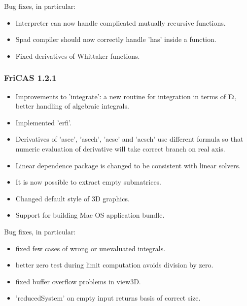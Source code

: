 Bug fixes, in particular:

\begin{itemize}
\item Interpreter can now handle complicated mutually recursive
  functions.

\item Spad compiler should now correctly handle 'has' inside a function.

\item Fixed derivatives of Whittaker functions.
\end{itemize}

\subsubsection{FriCAS 1.2.1}
\begin{itemize}
\item Improvements to 'integrate': a new routine for integration in
  terms of Ei, better handling of algebraic integrals.

\item Implemented 'erfi'.

\item Derivatives of 'asec', 'asech', 'acsc' and 'acsch' use different
  formula so that numeric evaluation of derivative will take correct
  branch on real axis.

\item Linear dependence package is changed to be consistent with
  linear solvers.

\item It is now possible to extract empty submatrices.

\item Changed default style of 3D graphics.

\item Support for building Mac OS application bundle.
\end{itemize}

Bug fixes, in particular:

\begin{itemize}
\item fixed few cases of wrong or unevaluated integrals.

\item better zero test during limit computation avoids division by
  zero.

\item fixed buffer overflow problems in view3D.

\item 'reducedSystem' on empty input returns basis of correct size.
\end{itemize}

